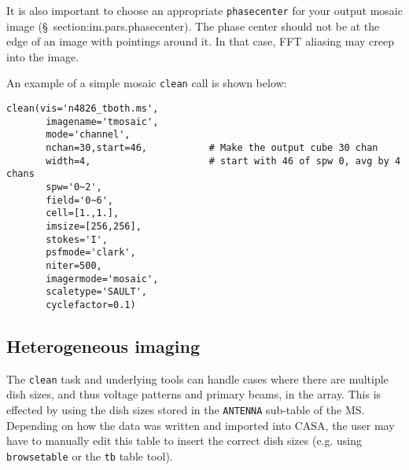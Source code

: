 It is also important to choose an appropriate {\tt phasecenter} for
your output mosaic image (\S~{section:im.pars.phasecenter}). The phase
center should not be at the edge of an image with pointings around
it. In that case, FFT aliasing may creep into the image. 


An example of a simple mosaic {\tt clean} call is shown below: 
\small
\begin{verbatim}
clean(vis='n4826_tboth.ms',        
       imagename='tmosaic',         
       mode='channel',
       nchan=30,start=46,           # Make the output cube 30 chan
       width=4,                     # start with 46 of spw 0, avg by 4 chans
       spw='0~2',
       field='0~6',
       cell=[1.,1.],
       imsize=[256,256],
       stokes='I',
       psfmode='clark',
       niter=500,
       imagermode='mosaic',
       scaletype='SAULT',
       cyclefactor=0.1)
\end{verbatim}
\normalsize


\subsection{Heterogeneous imaging}
\label{section:im.clean.hetero}

The {\tt clean} task and underlying tools can handle cases where
there are multiple dish sizes, and thus voltage patterns and primary
beams, in the array.  This is effected by using the dish sizes stored
in the {\tt ANTENNA} sub-table of the MS.  Depending on how the data
was written and imported into CASA, the user may have to manually edit
this table to insert the correct dish sizes (e.g. using {\tt
browsetable} or the {\tt tb} table tool).  


